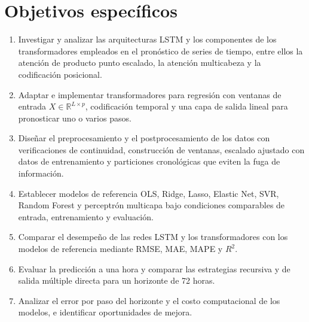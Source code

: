 \section{Objetivos específicos}

\begin{enumerate}
  \item Investigar y analizar las arquitecturas LSTM y los componentes de los transformadores empleados en el pronóstico de series de tiempo, entre ellos la atención de producto punto escalado, la atención multicabeza y la codificación posicional.
  \item Adaptar e implementar transformadores para regresión con ventanas de entrada $X\in\mathbb{R}^{L\times p}$, codificación temporal y una capa de salida lineal para pronosticar uno o varios pasos.
  \item Diseñar el preprocesamiento y el postprocesamiento de los datos con verificaciones de continuidad, construcción de ventanas, escalado ajustado con datos de entrenamiento y particiones cronológicas que eviten la fuga de información.
  \item Establecer modelos de referencia OLS, Ridge, Lasso, Elastic Net, SVR, Random Forest y perceptrón multicapa bajo condiciones comparables de entrada, entrenamiento y evaluación.
  \item Comparar el desempeño de las redes LSTM y los transformadores con los modelos de referencia mediante RMSE, MAE, MAPE y $R^2$.
  \item Evaluar la predicción a una hora y comparar las estrategias recursiva y de salida múltiple directa para un horizonte de 72 horas.
  \item Analizar el error por paso del horizonte y el costo computacional de los modelos, e identificar oportunidades de mejora.
\end{enumerate}
